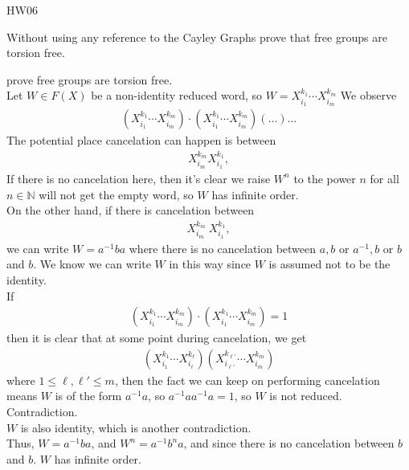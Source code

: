 \documentclass{article}
\begin{document}
\maketitle
HW06 \\
\pagebreak

\begin{homeworkProblem}
    Without using any reference to the Cayley Graphs prove that 
    free groups are torsion free.

    \solution

    prove free groups are torsion free.\\
    Let $W \in F(X)$ be a non-identity reduced word,
    so $W = X_{i_1}^{k_1} \cdots X_{i_m}^{k_m}$
    We observe 
    \begin{align}
        \left( X_{i_1}^{k_1} \cdots X_{i_m}^{k_m} \right) \cdot \left( X_{i_1}^{k_1} \cdots X_{i_m}^{k_m} \right) \left( \ldots \right) \ldots
    \end{align}
    The potential place cancelation can happen is between 
    \begin{align}
        X_{i_m}^{k_m} X_{i_1}^{k_1},
    \end{align}
    If there is no cancelation here, then it's clear we 
    raise $W^n$ to the power $n$ for all $n \in \mathbb{N}$
    will not get the empty word, so $W$ has infinite order.\\
    On the other hand, if there  is cancelation between 
    \begin{align}
        X_{i_m}^{k_m} \ X_{i_1}^{k_1},
    \end{align}
    we can write $W = a^{-1} b a$ where there is 
    no cancelation between $a, b$ or 
    $a^{-1}, b$ or $b$ and $b$. We know
    we can write $W$ in this way since 
    $W$ is assumed not to be the identity.\\
    If 
    \begin{align}
        \left( X_{i_1}^{k_1} \cdots X_{i_m}^{k_m} \right) \cdot \left( X_{i_1}^{k_1} \cdots X_{i_m}^{k_m} \right) = 1
    \end{align}
    then it is clear that at some point during cancelation, we get
    \begin{align}
        \left( X_{i_1}^{k_1} \cdots X_{i_{\ell}}^{k_{\ell}} \right) \left( X_{i_{\ell'}}^{k_{\ell'}} \cdots X_{i_m}^{k_m}\right)
    \end{align}
    where $1 \leq \ell, \ell' \leq m$, then the fact we can keep on performing 
    cancelation means $W$ is of the form $a^{-1}a$, so 
    $a^{-1} a a^{-1} a = 1$, so $W$ is not reduced. Contradiction.\\
    $W$ is also identity, which is another contradiction.\\

    Thus, $W = a^{-1} b a$, and $W^n = a^{-1} b^n a$, 
    and since there is no cancelation between $b$ and $b$. 
    $W$ has infinite order. 
    

\end{homeworkProblem}
\end{document}
